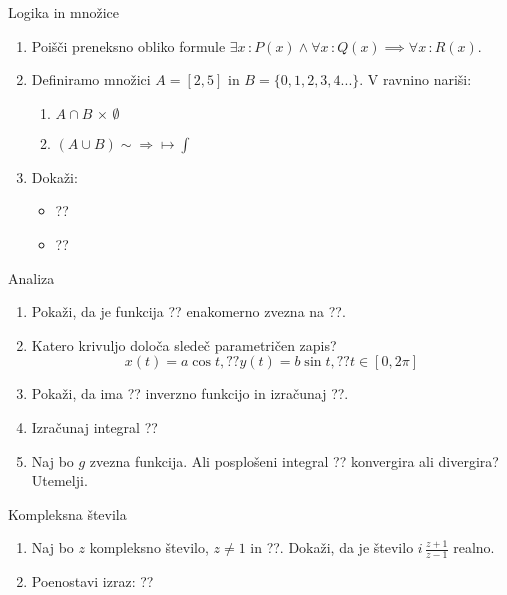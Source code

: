 \begin{frame}{Logika in množice}
	\begin{enumerate}
		\item
		Poišči preneksno obliko formule 
		\(\exists x \, \colon P(x) \land \forall x \, \colon Q(x) \implies \forall x\, \colon R(x)\).
		\item 
		Definiramo množici \(A=[2,5]\) in \(B=\{0,1,2,3,4...\} \).
		V ravnino nariši:
		\begin{enumerate}
		   \item \(A \cap B \, \times \, \emptyset \)
		   \item \((A \cup B) \sim \Rightarrow \mapsto \int \,\)
		\end{enumerate}
		\item
		Dokaži:
		\begin{itemize}
			\item ??
			\item ??
		\end{itemize}
	\end{enumerate}
\end{frame}

\begin{frame}{Analiza}
	\begin{enumerate}
		\item
		Pokaži, da je funkcija ?? enakomerno zvezna na ??.
		\item 
		Katero krivuljo določa sledeč parametričen zapis?
		$$
		   x(t) = a \cos t, ?? %
		   y(t) = b \sin t, ?? %
		   t \in [0, 2 \pi]
		$$ 
		\item
		Pokaži, da ima ?? inverzno funkcijo in izračunaj ??.
		
		\item
		Izračunaj integral 
		??
		\item 
		Naj bo $g$ zvezna funkcija. Ali posplošeni integral 
		??
		konvergira ali divergira? Utemelji.
	\end{enumerate}
\end{frame}

\begin{frame}{Kompleksna števila}
	\begin{enumerate}
		\item
		Naj bo $z$ kompleksno število, $z \ne 1$ in ??.
		Dokaži, da je število \( i \, \frac{z+1}{z-1} \) realno.
		\item
		Poenostavi izraz:
		??
	\end{enumerate}
\end{frame}